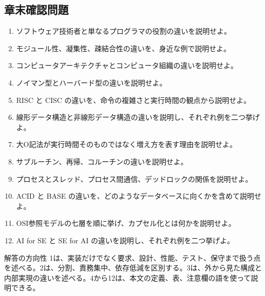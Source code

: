 \subsection{章末確認問題}

\begin{enumerate}[leftmargin=2em]
\item ソフトウェア技術者と単なるプログラマの役割の違いを説明せよ。
\item モジュール性、凝集性、疎結合性の違いを、身近な例で説明せよ。
\item コンピュータアーキテクチャとコンピュータ組織の違いを説明せよ。
\item ノイマン型とハーバード型の違いを説明せよ。
\item RISC と CISC の違いを、命令の複雑さと実行時間の観点から説明せよ。
\item 線形データ構造と非線形データ構造の違いを説明し、それぞれ例を二つ挙げよ。
\item 大O記法が実行時間そのものではなく増え方を表す理由を説明せよ。
\item サブルーチン、再帰、コルーチンの違いを説明せよ。
\item プロセスとスレッド、プロセス間通信、デッドロックの関係を説明せよ。
\item ACID と BASE の違いを、どのようなデータベースに向くかを含めて説明せよ。
\item OSI参照モデルの七層を順に挙げ、カプセル化とは何かを説明せよ。
\item AI for SE と SE for AI の違いを説明し、それぞれ例を二つ挙げよ。
\end{enumerate}

\begin{pointbox}{解答の方向性}
1は、実装だけでなく要求、設計、性能、テスト、保守まで扱う点を述べる。2は、分割、責務集中、依存低減を区別する。3は、外から見た構成と内部実現の違いを述べる。4から12は、本文の定義、表、注意欄の語を使って説明できる。

\end{pointbox}
